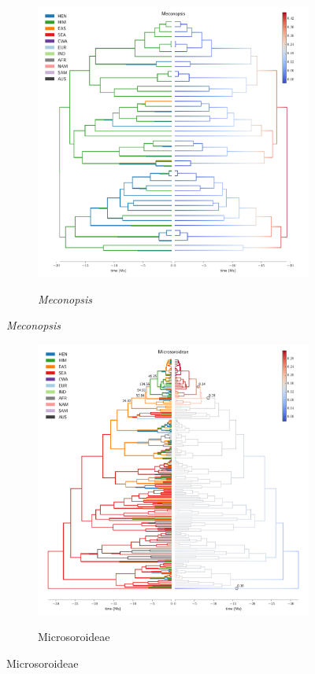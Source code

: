 \begin{figure}
  \ContinuedFloat
\begin{subfigure}{\textwidth}
\centering
\includegraphics[width=.99\linewidth]{figures/Meconopsis-supfig.pdf}
\label{fig:allium}
\caption{\textit{Meconopsis}}
\end{subfigure}
\end{figure}

\begin{figure}
  \ContinuedFloat
\begin{subfigure}{\textwidth}
\centering
\includegraphics[width=.99\linewidth]{figures/Microsoroideae-supfig.pdf}
\label{fig:allium}
\caption{Microsoroideae}
\end{subfigure}
\end{figure}

